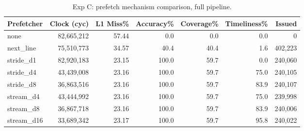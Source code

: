 \begin{table}[H]\centering\small
\begin{tabular}{lrrrrrr}\toprule
Prefetcher & Clock (cyc) & L1 Miss\% & Accuracy\% & Coverage\% & Timeliness\% & Issued \\ \midrule
none & 82,665,212 & 57.44 & 0.0 & 0.0 & 0.0 & 0 \\
next\_line & 75,510,773 & 34.57 & 40.4 & 40.4 & 1.6 & 402,223 \\
stride\_d1 & 82,920,183 & 23.15 & 100.0 & 59.7 & 0.0 & 240,060 \\
stride\_d4 & 43,439,008 & 23.16 & 100.0 & 59.7 & 75.0 & 240,105 \\
stride\_d8 & 36,863,516 & 23.16 & 100.0 & 59.7 & 83.9 & 240,107 \\
stream\_d4 & 43,444,992 & 23.16 & 100.0 & 59.7 & 75.0 & 239,998 \\
stream\_d8 & 36,867,718 & 23.16 & 100.0 & 59.7 & 83.9 & 240,006 \\
stream\_d16 & 33,689,342 & 23.17 & 100.0 & 59.7 & 95.8 & 240,022 \\
\bottomrule\end{tabular}
\caption{Exp C: prefetch mechanism comparison, full pipeline.}
\label{tab:expC}\end{table}

